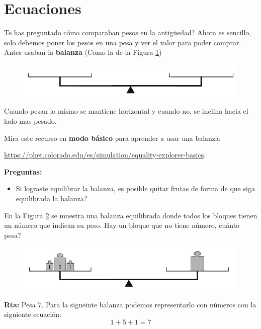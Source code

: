 \section{Ecuaciones }\label{section:ecuaciones}
Te has preguntado cómo comparaban pesos en la antigüedad? Ahora es sencillo, solo debemos poner los pesos en una pesa y ver el valor para poder comprar. Antes usaban la \textbf{balanza} (Como la de la Figura \ref{fig_balanza})

\begin{figure}[H]
	\centering
	\includegraphics[width=0.6\linewidth]{Algebra/imgs/balanza_vacia.png}
	\label{fig_balanza}
\end{figure}

Cuando pesan lo mismo se mantiene horizontal y cuando no, se inclina hacia el lado mas pesado.

\begin{tcolorbox}[colback=black!5!white,colframe=black]
	Mira este recurso en \textbf{modo básico} para aprender a usar una balanza:
	\begin{center}
		\url{https://phet.colorado.edu/es/simulation/equality-explorer-basics}.
	\end{center} 
	\textbf{Preguntas:}
	\begin{itemize}
		\item Si lograste equilibrar la balanza, es posible quitar frutas de forma de que siga equilibrada la balanza?
	\end{itemize}
\end{tcolorbox}

\begin{ejemplo}
	En la Figura \ref{fig_balanza2} se muestra una balanza equilibrada donde todos los bloques tienen un número que indican su peso. Hay un bloque que no tiene número, cuánto pesa?
	\begin{figure}[H]
		\centering
		\includegraphics[width=0.8\linewidth]{Algebra/imgs/balanza_2.png}
		\label{fig_balanza2}
	\end{figure}
	\textbf{Rta:} Pesa 7. Para la sigueinte balanza podemos representarlo con números con la siguiente ecuación:
	\[
		1+5+1=7
	\]
\end{ejemplo}

